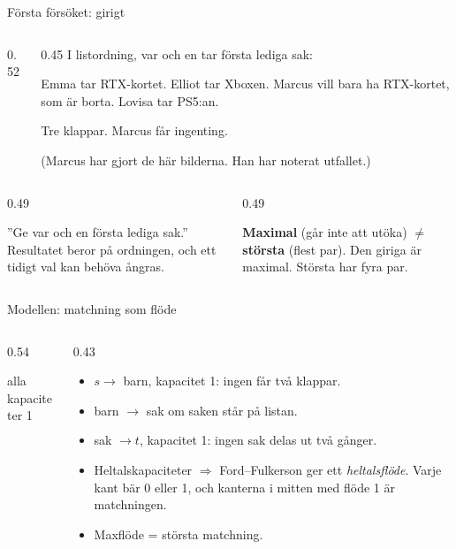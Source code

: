 \begin{frame}{Första försöket: girigt}
\begin{columns}[T]
\begin{column}{0.52\textwidth}
\centering

\end{column}
\begin{column}{0.45\textwidth}
\small
I listordning, var och en tar första lediga sak:\par\smallskip
Emma tar RTX-kortet. Elliot tar Xboxen. Marcus vill bara ha RTX-kortet, som är borta.
Lovisa tar PS5:an.\par\smallskip
Tre klappar. Marcus får ingenting.\par\smallskip
{\footnotesize\color{black!55}(Marcus har gjort de här bilderna. Han har noterat utfallet.)}
\end{column}
\end{columns}
\vfill
\begin{columns}[T]
\begin{column}{0.49\textwidth}
\begin{missbox}[fontupper=\footnotesize]
”Ge var och en första lediga sak.” Resultatet beror på ordningen, och ett tidigt val kan
behöva ångras.
\end{missbox}
\end{column}
\begin{column}{0.49\textwidth}
\begin{ahabox}[fontupper=\footnotesize]
\textbf{Maximal} (går inte att utöka) $\neq$ \textbf{största} (flest par). Den giriga är maximal.
Största har fyra par.
\end{ahabox}
\end{column}
\end{columns}
\end{frame}

\begin{frame}{Modellen: matchning som flöde}
\begin{columns}[T]
\begin{column}{0.54\textwidth}
\centering
\par
{\scriptsize alla kapaciteter 1}
\end{column}
\begin{column}{0.43\textwidth}
\small
\begin{itemize}\setlength{\itemsep}{3pt}
  \item $s\to$ barn, kapacitet 1: ingen får två klappar.
  \item barn $\to$ sak om saken står på listan.
  \item sak $\to t$, kapacitet 1: ingen sak delas ut två gånger.
  \item Heltalskapaciteter $\Rightarrow$ Ford--Fulkerson ger ett \emph{heltalsflöde}. Varje
        kant bär 0 eller 1, och kanterna i mitten med flöde 1 är matchningen.
  \item Maxflöde = största matchning.
\end{itemize}
\end{column}
\end{columns}
\end{frame}

